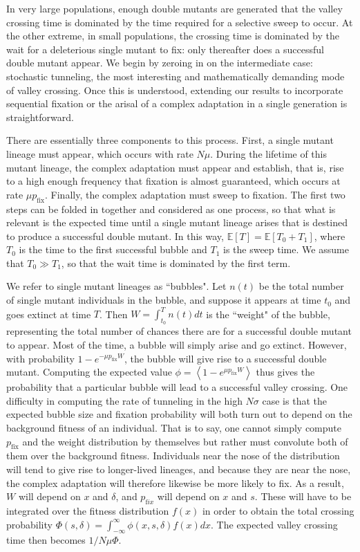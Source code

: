 \documentclass[rmp]{revtex4}
\begin{document}
In very large populations, enough double mutants are generated that the valley crossing time is dominated by the time required for a selective sweep to occur.
At the other extreme, in small populations, the crossing time is dominated by the wait for a deleterious single mutant to fix: only thereafter does a successful double mutant appear.
We begin by zeroing in on the intermediate case: stochastic tunneling, the most interesting and mathematically demanding mode of valley crossing.
Once this is understood, extending our results to incorporate sequential fixation or the arisal of a complex adaptation in a single generation is straightforward.

There are essentially three components to this process.
First, a single mutant lineage must appear, which occurs with rate $N\mu$.
During the lifetime of this mutant lineage, the complex adaptation must appear and establish, that is, rise to a high enough frequency that fixation is almost guaranteed, which occurs at rate $\mu p_{\mathrm {fix}}$.
Finally, the complex adaptation must sweep to fixation.
The first two steps can be folded in together and considered as one process, so that what is relevant is the expected time until a single mutant lineage arises that is destined to produce a successful double mutant.
In this way, $\mathbb{E}\left[ T \right] = \mathbb{E} \left[ T_0 + T_1 \right]$, where $T_0$ is the time to the first successful bubble and $T_1$ is the sweep time.
We assume that $T_0 \gg T_1$, so that the wait time is dominated by the first term.

We refer to single mutant lineages as ``bubbles".
Let $n(t)$ be the total number of single mutant individuals in the bubble, and suppose it appears at time $t_0$ and goes extinct at time $T$.
Then $W = \int_{t_0}^T n(t)dt$ is the ``weight" of the bubble, representing the total number of chances there are for a successful double mutant to appear.
Most of the time, a bubble will simply arise and go extinct.
However, with probability $1-e^{-\mu p_{\mathrm{fix}} W}$, the bubble will give rise to a successful double mutant.
Computing the expected value $\phi = \left< 1-e^{\mu p_{\mathrm {fix}} W} \right>$ thus gives the probability that a particular bubble will lead to a successful valley crossing.
One difficulty in computing the rate of tunneling in the high $N\sigma$ case is that the expected bubble size and fixation probability will both turn out to depend on the background fitness of an individual.
That is to say, one cannot simply compute $p_{\mathrm{fix}}$ and the weight distribution by themselves but rather must convolute both of them over the background fitness.
Individuals near the nose of the distribution will tend to give rise to longer-lived lineages, and because they are near the nose, the complex adaptation will therefore likewise be more likely to fix.
As a result, $W$ will depend on $x$ and $\delta$, and $p_{\mathrm fix}$ will depend on $x$ and $s$.
These will have to be integrated over the fitness distribution $f(x)$ in order to obtain the total crossing probability $\Phi(s,\delta) = \int_{-\infty}^\infty \phi(x,s,\delta) f(x) dx$.
The expected valley crossing time then becomes $1/N\mu\Phi$.
\end{document}
